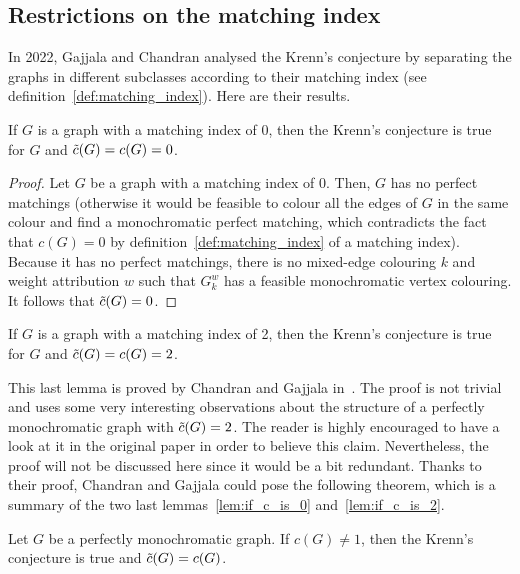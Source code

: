 \subsection{Restrictions on the matching index}
\label{subsec:proved-special-cases-matching-index}

In 2022, Gajjala and Chandran analysed the Krenn's conjecture by separating the graphs in different subclasses according to their matching index (see definition~\ref{def:matching_index}).
Here are their results.

\begin{lemma}
    \label{lem:if_c_is_0}
    If $G$ is a graph with a matching index of 0, then the Krenn's conjecture is true for $G$ and $\Tilde{c}(G) = c(G) = 0$.
\end{lemma}

\begin{proof}
    Let $G$ be a graph with a matching index of 0.
    Then, $G$ has no perfect matchings (otherwise it would be feasible to colour all the edges of $G$ in the same colour and find a monochromatic perfect matching, which contradicts the fact that $c(G) = 0$ by definition~\ref{def:matching_index} of a matching index).
    Because it has no perfect matchings, there is no mixed-edge colouring $k$ and weight attribution $w$ such that $G_k^w$ has a feasible monochromatic vertex colouring.
    It follows that $\Tilde{c}(G) = 0$.
\end{proof}

\begin{lemma}
    \label{lem:if_c_is_2}
    If $G$ is a graph with a matching index of 2, then the Krenn's conjecture is true for $G$ and $\Tilde{c}(G) = c(G) = 2$.
\end{lemma}

This last lemma is proved by Chandran and Gajjala in~\cite{chandran}.
The proof is not trivial and uses some very interesting observations about the structure of a perfectly monochromatic graph with $\Tilde{c}(G) = 2$.
The reader is highly encouraged to have a look at it in the original paper in order to believe this claim.
Nevertheless, the proof will not be discussed here since it would be a bit redundant.
Thanks to their proof, Chandran and Gajjala could pose the following theorem, which is a summary of the two last lemmas~\ref{lem:if_c_is_0} and~\ref{lem:if_c_is_2}.

\begin{theorem}
    \label{thm:c_not_1}
    Let $G$ be a perfectly monochromatic graph.
    If $c(G) \neq 1$, then the Krenn's conjecture is true and $\Tilde{c}(G) = c(G)$.
\end{theorem}

